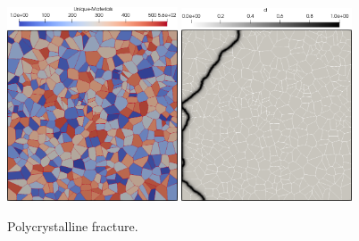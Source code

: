 \begin{figure}
	\centering
	\includegraphics[width=0.45\textwidth]{./Images/poly-crys.png}    \includegraphics[width=0.45\textwidth]{./Images/polycrys.png}
	\caption{Polycrystalline fracture.}
	\label{fig:Polycrystalline}
\end{figure}

